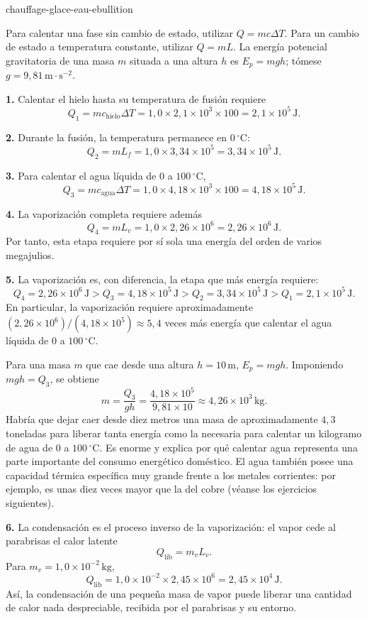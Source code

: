 \begin{exo}{chauffage-glace-eau-ebullition}
\begin{indication}
Para calentar una fase sin cambio de estado, utilizar $Q=mc\Delta T$. Para un cambio de estado a temperatura constante, utilizar $Q=mL$. La energía potencial gravitatoria de una masa $m$ situada a una altura $h$ es $E_p=mgh$; tómese $g=9{,}81\,\text{m}\!\cdot\!\text{s}^{-2}$.
\end{indication}

\begin{solution}
\textbf{1.} Calentar el hielo hasta su temperatura de fusión requiere
\[
Q_1=mc_{\text{hielo}}\Delta T
=1{,}0\times2{,}1\times10^3\times100
=2{,}1\times10^5\,\text{J}.
\]

\textbf{2.} Durante la fusión, la temperatura permanece en $0\,{}^\circ\text{C}$:
\[
Q_2=mL_f=1{,}0\times3{,}34\times10^5
=3{,}34\times10^5\,\text{J}.
\]

\textbf{3.} Para calentar el agua líquida de $0$ a $100\,{}^\circ\text{C}$,
\[
Q_3=mc_{\text{agua}}\Delta T
=1{,}0\times4{,}18\times10^3\times100
=4{,}18\times10^5\,\text{J}.
\]

\textbf{4.} La vaporización completa requiere además
\[
Q_4=mL_v=1{,}0\times2{,}26\times10^6
=2{,}26\times10^6\,\text{J}.
\]
Por tanto, esta etapa requiere por sí sola una energía del orden de varios megajulios.

\textbf{5.} La vaporización es, con diferencia, la etapa que más energía requiere:
\[
Q_4=2{,}26\times10^6\,\text{J}
>Q_3=4{,}18\times10^5\,\text{J}
>Q_2=3{,}34\times10^5\,\text{J}
>Q_1=2{,}1\times10^5\,\text{J}.
\]
En particular, la vaporización requiere aproximadamente $(2{,}26\times10^6)/(4{,}18\times10^5)\approx5{,}4$ veces más energía que calentar el agua líquida de $0$ a $100\,{}^\circ\text{C}$.

Para una masa $m$ que cae desde una altura $h=10\,\text{m}$, $E_p=mgh$. Imponiendo $mgh=Q_3$, se obtiene
\[
m=\frac{Q_3}{gh}
=\frac{4{,}18\times10^5}{9{,}81\times10}
\approx4{,}26\times10^3\,\text{kg}.
\]
Habría que dejar caer desde diez metros una masa de aproximadamente $4{,}3$ toneladas para liberar tanta energía como la necesaria para calentar un kilogramo de agua de $0$ a $100\,{}^\circ\text{C}$. Es enorme y explica por qué calentar agua representa una parte importante del consumo energético doméstico. El agua también posee una capacidad térmica específica muy grande frente a los metales corrientes: por ejemplo, es unas diez veces mayor que la del cobre (véanse los ejercicios siguientes).

\textbf{6.} La condensación es el proceso inverso de la vaporización: el vapor cede al parabrisas el calor latente
\[
Q_{\text{lib}}=m_vL_v.
\]
Para $m_v=1{,}0\times10^{-2}\,\text{kg}$,
\[
Q_{\text{lib}}=1{,}0\times10^{-2}\times2{,}45\times10^6
=2{,}45\times10^4\,\text{J}.
\]
Así, la condensación de una pequeña masa de vapor puede liberar una cantidad de calor nada despreciable, recibida por el parabrisas y su entorno.
\end{solution}
\end{exo}
